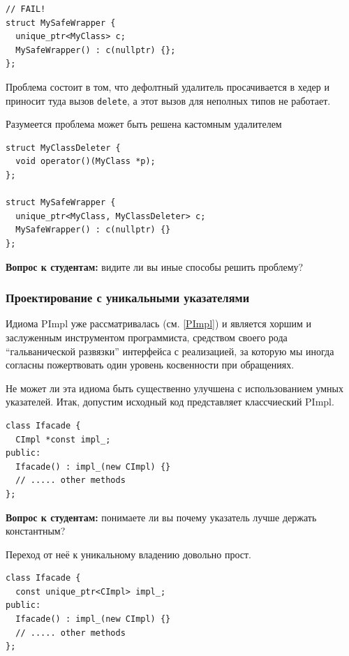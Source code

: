 \documentclass[a4paper,12pt,oneside]{article}
\newif\ifanswers
\begin{document}
\begin{lstlisting}
// FAIL!
struct MySafeWrapper {
  unique_ptr<MyClass> c; 
  MySafeWrapper() : c(nullptr) {};
};
\end{lstlisting}

Проблема состоит в том, что дефолтный удалитель просачивается в хедер и приносит туда вызов \lstinline!delete!, а этот вызов для неполных типов не работает.

Разумеется проблема может быть решена кастомным удалителем

\begin{lstlisting}
struct MyClassDeleter {
  void operator()(MyClass *p);
};

struct MySafeWrapper { 
  unique_ptr<MyClass, MyClassDeleter> c; 
  MySafeWrapper() : c(nullptr) {}
};
\end{lstlisting}

\textbf{Вопрос к студентам:} видите ли вы иные способы решить проблему?
\ifanswers
Правильный ответ: да, например не определять конструктор в хедере.
\fi

\subsubsection{Проектирование с уникальными указателями}\label{subsub:uniquetrees}

Идиома PImpl уже рассматривалась (см. \ref{PImpl}) и является хоршим и заслуженным инструментом программиста, средством своего рода ``гальванической развязки'' интерфейса с реализацией, за которую мы иногда согласны пожертвовать один уровень косвенности при обращениях.

Не может ли эта идиома быть существенно улучшена с использованием умных указателей. Итак, допустим исходный код представляет классчиеский PImpl.

\begin{lstlisting}
class Ifacade {
  CImpl *const impl_;
public:
  Ifacade() : impl_(new CImpl) {}  
  // ..... other methods
};
\end{lstlisting}

\textbf{Вопрос к студентам:} понимаете ли вы почему указатель лучше держать константным?

\ifanswers
Правильный ответ: например чтобы не забыть его инициализировать и чтобы заблокировать всякие копирующие и прочие конструкторы по умолчанию
\fi

Переход от неё к уникальному владению довольно прост.

\begin{lstlisting}
class Ifacade {
  const unique_ptr<CImpl> impl_;
public:
  Ifacade() : impl_(new CImpl) {}
  // ..... other methods
};
\end{lstlisting}
\end{document}
